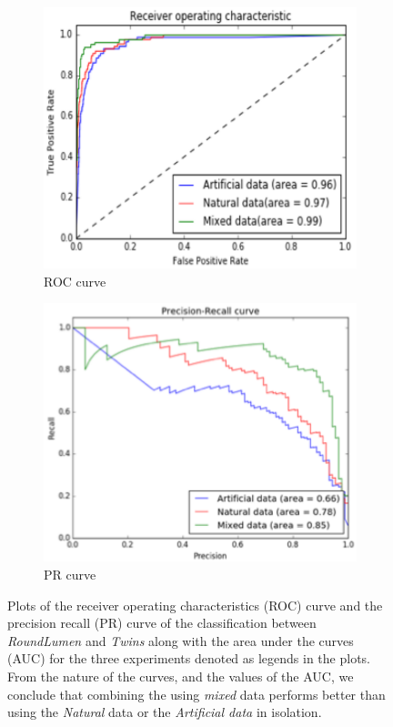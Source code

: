 \begin{figure}[ht!]
    \centering
    \begin{subfigure}[t]{0.5\textwidth}
     \centering
       \includegraphics[width=1.0\linewidth]{img/single_twins_ROC.pdf}
  \caption{ROC curve}
        \label{fig:ROC1}   
    \end{subfigure}%
    \begin{subfigure}[t]{0.5\textwidth}
        \centering
          \includegraphics[width=1.0\linewidth]{img/single_twins_PRC.pdf}
  \caption{PR curve }
        \label{fig:PRC1}
    \end{subfigure}%
    \caption{Plots of the receiver operating characteristics (ROC) curve and the precision recall (PR) curve of the classification between \textit{RoundLumen} and \textit{Twins} along with the area under the curves (AUC) for the three experiments denoted as legends in the plots. From the nature of the curves, and the values of the AUC, we conclude that combining the using \textit{mixed} data performs better than using the \textit{Natural} data or the \textit{Artificial data} in isolation.}
    \label{fig:ROC_PRC1}
\end{figure}


